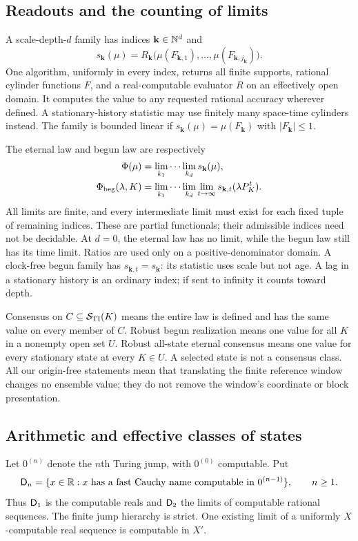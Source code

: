 \subsection{Readouts and the counting of limits}
\begin{definition}\label{def:statistics}
A scale-depth-$d$ family has indices $\mathbf k\in\mathbb N^d$ and
\[
 s_{\mathbf k}(\mu)=
 R_{\mathbf k}\bigl(\mu(F_{\mathbf k,1}),\ldots,
                         \mu(F_{\mathbf k,j_{\mathbf k}})\bigr).
\]
One algorithm, uniformly in every index, returns all finite supports,
rational cylinder functions $F$, and a real-computable evaluator
$R$ on an effectively open domain. It computes the value to any
requested rational accuracy wherever defined. A stationary-history
statistic may use finitely many space-time cylinders instead.
The family is bounded linear if $s_{\mathbf k}(\mu)=\mu(F_{\mathbf k})$
with $|F_{\mathbf k}|\leq1$.
\end{definition}
The eternal law and begun law are respectively
\begin{align}
 \Phi(\mu)&=\lim_{k_1}\cdots\lim_{k_d}s_{\mathbf k}(\mu),
       \label{eq:eternal}\\
 \Phi_{\rm beg}(\lambda,K)&=
   \lim_{k_1}\cdots\lim_{k_d}\lim_{t\to\infty}
          s_{\mathbf k,t}(\lambda P_K^t).
       \label{eq:begun}
\end{align}
All limits are finite, and every intermediate limit must exist for
each fixed tuple of remaining indices. These are partial functionals;
their admissible indices need not be decidable. At $d=0$, the eternal
law has no limit, while the begun law still has its time limit.
Ratios are used only on a positive-denominator domain. A clock-free
begun family has $s_{\mathbf k,t}=s_{\mathbf k}$: its statistic uses
scale but not age. A lag in a stationary history is an ordinary index;
if sent to infinity it counts toward depth.

Consensus on $C\subseteq\mathcal S_{\rm TI}(K)$ means the entire law is defined
and has the same value on every member of $C$. Robust begun
realization means one value for all $K$ in a nonempty open set $U$.
Robust all-state eternal consensus means one value for every
stationary state at every $K\in U$. A selected state is not a
consensus class. All our origin-free statements mean that translating
the finite reference window changes no ensemble value; they do not
remove the window's coordinate or block presentation.

\subsection{Arithmetic and effective classes of states}
Let $0^{(n)}$ denote the $n$th Turing jump, with $0^{(0)}$ computable.
Put
\[
 \mathsf D_n=\{x\in\mathbb R:x\text{ has a fast Cauchy name computable in }
                        0^{(n-1)}\},\qquad n\geq1.
\]
Thus $\mathsf D_1$ is the computable reals and $\mathsf D_2$ the limits of
computable rational sequences. The finite jump hierarchy is strict.
One existing limit of a uniformly $X$-computable real sequence is
computable in $X'$.

